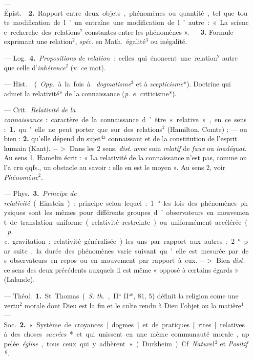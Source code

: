 \begin{itemize}[leftmargin=1cm, label=, itemsep=1pt]
— \si{Épist.}  {\bf 2.} Rapport entre
deux objets, phénomènes ou quantité,
tel que toute modification de l’un entraîne une modification de l’autre : «
La science recherche des relations$^2$ constantes entre les phénomènes ». —
 {\bf 3.} Formule exprimant une relation$^2$, {\it spéc.} en
\si{Math.} égalité$^3$ ou inégalité.

— \si{Log.} {\bf 4.} {\it Propositions de relation} : celles qui énoncent une
relation$^2$ autre que celle d’{\it inhérence}$^2$ (v. ce mot).

 — \si{Hist.}  ({\it Opp.} à la fois à {\it
dogmatisme}$^3$ et à {\it scepticisme}*). Doctrine qui admet la relativité*
de la connaissance ({\it p. e.} criticisme*).

 — \si{Crit.} {\it Relativité de la connaissance} : caractère
de la connaissance d’être « relative », en ce sens : {\bf 1.} qu’elle ne peut
porter que sur des relations$^2$ (Hamilton, Comte) ; — ou bien : {\bf 2.}
qu’elle dépend du sujet$^\text{4a}$ connaissant et de la constitution de
l'esprit humain (Kant). $->$ Dans les 2 sens, {\it dist.} avec soin {\it
relatif} de {\it faux} ou {\it inadéquat}. Au sens 1, Hamelin écrit : « La
relativité de la connaissance n’est pas, comme on l’a cru qqfs., un obstacle
au savoir : elle en est le moyen ». Au sens 2, voir {\it Phénomène}$^2$.

— \si{Phys.} {\bf 3.} {\it Principe de relativité} (Einstein) : principe
selon lequel : 1° les lois des phénomènes physiques sont les mêmes pour
différents groupes d’observateurs en mouvement de translation uniforme
(relativité restreinte) ou uniformément accélérée ({\it p. e.} gravitation :
relativité généralisée) les uns par rapport aux autres; 2° par suite, la
durée des phénomènes varie suivant qu’elle est mesurée par des observateurs
en repos ou en mouvement par rapport à eux. $->$ Bien {\it dist.} ce sens des
deux précédents auxquels il est même « opposé à certains égards » (Lalande).

 — \si{Théol.} {\bf 1.} St. Thomas ({\it S. th.}, II$^\text{a}$
II$^\text{ae}$, 81, 5) définit la religion come une vertu$^2$ morale dont
Dieu est la fin et le culte rendu à Dieu l’objet ou la matière$^1$ — \si{Soc.}
{\bf 2.} « Système de croyances [dogmes] et de pratiques [rites] relatives à
des choses {\it sacrées}* et qui unissent en une même communauté morale,
appelée {\it église}, tous ceux qui y adhèrent » (Durkheim). Cf.
{\it Naturel}$\,^2$ et {\it Positif}$\,^6$.


\end{itemize}
